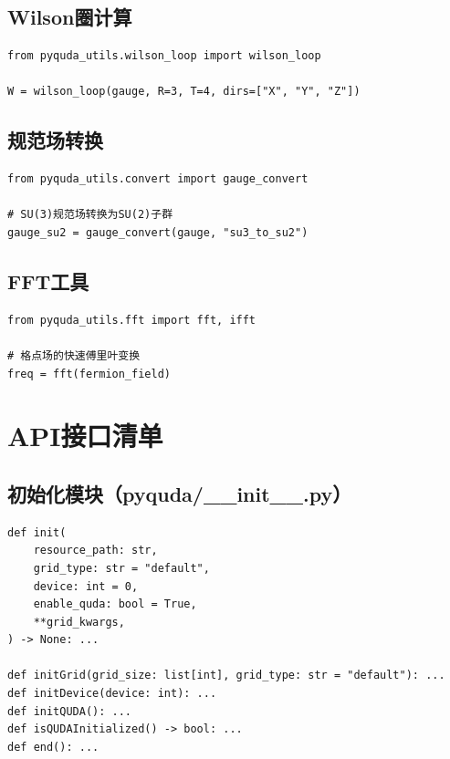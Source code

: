 \documentclass[12pt,a4paper]{ctexart}
\begin{document}
\subsection{Wilson圈计算}

\begin{lstlisting}[caption={Wilson圈}]
from pyquda_utils.wilson_loop import wilson_loop

W = wilson_loop(gauge, R=3, T=4, dirs=["X", "Y", "Z"])
\end{lstlisting}

\subsection{规范场转换}

\begin{lstlisting}[caption={规范场格式转换}]
from pyquda_utils.convert import gauge_convert

# SU(3)规范场转换为SU(2)子群
gauge_su2 = gauge_convert(gauge, "su3_to_su2")
\end{lstlisting}

\subsection{FFT工具}

\begin{lstlisting}[caption={FFT操作}]
from pyquda_utils.fft import fft, ifft

# 格点场的快速傅里叶变换
freq = fft(fermion_field)
\end{lstlisting}

\section{API接口清单}

\subsection{初始化模块（pyquda/\_\_init\_\_.py）}

\begin{lstlisting}[caption={初始化函数}]
def init(
    resource_path: str,
    grid_type: str = "default",
    device: int = 0,
    enable_quda: bool = True,
    **grid_kwargs,
) -> None: ...

def initGrid(grid_size: list[int], grid_type: str = "default"): ...
def initDevice(device: int): ...
def initQUDA(): ...
def isQUDAInitialized() -> bool: ...
def end(): ...
\end{lstlisting}
\end{document}
